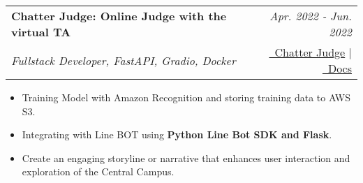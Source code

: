 \documentclass[a4paper,11pt]{article}
\makeatletter
\newcommand{\resumeSubheading}[4]{
\vspace{0.5mm}\item
    \begin{tabular*}{0.98\textwidth}[t]{l@{\extracolsep{\fill}}r}
        \textbf{#1} & \textit{\footnotesize{#4}} \\
        \textit{\footnotesize{#3}} &  \footnotesize{#2}\\
    \end{tabular*}
    \vspace{-2.4mm}
}
\newcommand{\resumeItemListStart}{\begin{justify}\begin{itemize}[
    leftmargin=3ex, 
    rightmargin=2ex, 
    noitemsep,
    labelsep=1.2mm,
    itemsep=0.5mm
    ]\small
}
\newcommand{\resumeItemListEnd}{\end{itemize}\end{justify}\vspace{-2mm}}
\makeatother
\begin{document}
            
            
            


        \resumeSubheading
            { Chatter Judge: Online Judge with the virtual TA} 
            {
                \href{https://github.com/1chooo/chatter-judge}{\faGithub\ Chatter Judge} 
                |
                \href{https://1chooo.github.io/chatter-judge/}{\textcolor{black}{\faDesktop}\ Docs} 
            } %
            {Fullstack Developer, FastAPI, Gradio, Docker}%
            {Apr. 2022 - Jun. 2022} %
            
            \vspace{-1.0mm}
            
            \resumeItemListStart
                \item {Training Model with Amazon Recognition and storing training data to AWS S3.}
                \item {Integrating with Line BOT using \textbf{Python Line Bot SDK and Flask}.}
                \item {Create an engaging storyline or narrative that enhances user interaction and exploration of the Central Campus.}
            \resumeItemListEnd

            
\end{document}
